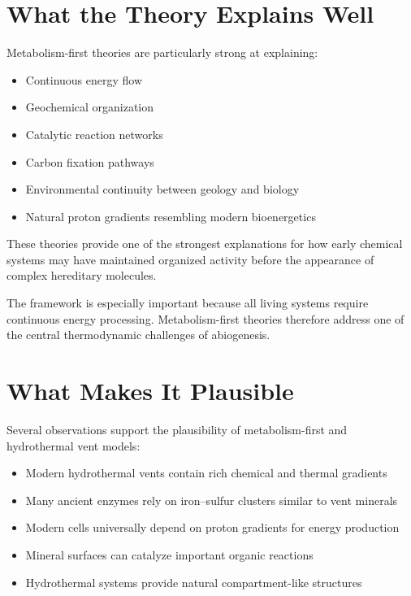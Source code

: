 \documentclass[
  oneside]{book}
\providecommand{\tightlist}{%
  \setlength{\itemsep}{0pt}\setlength{\parskip}{0pt}}
\begin{document}
\section{What the Theory Explains Well}\label{what-the-theory-explains-well-2}

Metabolism-first theories are particularly strong at explaining:

\begin{itemize}
\tightlist
\item
  Continuous energy flow
\item
  Geochemical organization
\item
  Catalytic reaction networks
\item
  Carbon fixation pathways
\item
  Environmental continuity between geology and biology
\item
  Natural proton gradients resembling modern bioenergetics
\end{itemize}

These theories provide one of the strongest explanations for how early chemical systems may have maintained organized activity before the appearance of complex hereditary molecules.

The framework is especially important because all living systems require continuous energy processing. Metabolism-first theories therefore address one of the central thermodynamic challenges of abiogenesis.

\section{What Makes It Plausible}\label{what-makes-it-plausible-2}

Several observations support the plausibility of metabolism-first and hydrothermal vent models:

\begin{itemize}
\tightlist
\item
  Modern hydrothermal vents contain rich chemical and thermal gradients
\item
  Many ancient enzymes rely on iron--sulfur clusters similar to vent minerals
\item
  Modern cells universally depend on proton gradients for energy production
\item
  Mineral surfaces can catalyze important organic reactions
\item
  Hydrothermal systems provide natural compartment-like structures
\end{itemize}
\end{document}
